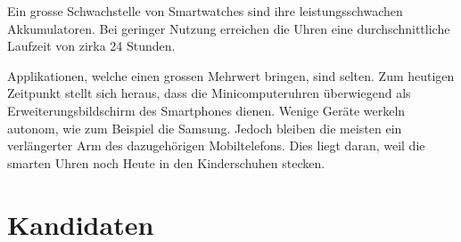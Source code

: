 Ein grosse Schwachstelle von Smartwatches sind ihre leistungsschwachen Akkumulatoren. Bei geringer Nutzung erreichen die Uhren eine durchschnittliche Laufzeit von zirka 24 Stunden.

Applikationen, welche einen grossen Mehrwert bringen, sind selten. Zum heutigen Zeitpunkt stellt sich heraus, dass die Minicomputeruhren überwiegend als Erweiterungsbildschirm des Smartphones dienen. Wenige Geräte werkeln autonom, wie zum Beispiel die Samsung. Jedoch bleiben die meisten ein verlängerter Arm des dazugehörigen Mobiltelefons. Dies liegt daran, weil die smarten Uhren noch Heute in den Kinderschuhen stecken.

\section{Kandidaten}
